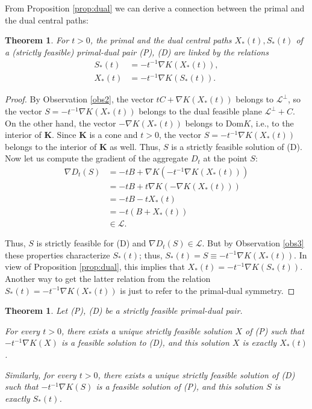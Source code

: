 \documentclass[11pt,a4paper]{article}
\newtheorem{theorem}[thm]{Theorem}
\begin{document}
From Proposition \ref{prop:dual} we can derive a connection between the primal and the dual central paths:

\begin{theorem}
    For $t>0$, the primal and the dual central paths $X_*(t), S_*(t)$ of a (strictly feasible) primal-dual pair (P), (D) are linked by the relations
    \begin{align*}
        S_*(t) &= -t^{-1}\nabla K(X_*(t)),\\
        X_*(t) &= -t^{-1}\nabla K(S_*(t)).
    \end{align*}
\end{theorem}

\begin{proof}
By Observation \ref{obs2}, the vector $tC+\nabla K(X_*(t))$ belongs to $\mathcal{L}^\perp$, so the vector $S = -t^{-1}\nabla K(X_*(t))$ belongs to the dual feasible plane $\mathcal{L}^\perp+C$. On the other hand, the vector $-\nabla K(X_*(t))$ belongs to Dom$K$, i.e., to the interior of $\textbf{K}$. Since $\textbf{K}$ is a cone and $t>0$, the vector $S=-t^{-1}\nabla K(X_*(t))$ belongs to the interior of $\textbf{K}$ as well. Thus, $S$ is a strictly feasible solution of (D). Now let us compute the gradient of the aggregate $D_t$ at the point $S$:
\begin{align*}
    \nabla D_t(S) 
    &= -tB+\nabla K(-t^{-1}\nabla K(X_*(t)))\\
    &= -tB+t\nabla K(-\nabla K(X_*(t)))\\
    &= -tB - tX_*(t)\\
    &= -t(B+X_*(t))\\
    &\in \mathcal{L}.
\end{align*}

Thus, $S$ is strictly feasible for (D) and $\nabla D_t(S) \in \mathcal{L}$. But by Observation \ref{obs3} these properties characterize $S_*(t)$; thus, $S_*(t)=S\equiv -t^{-1}\nabla K(X_*(t))$. In view of Proposition \ref{prop:dual}, this implies that $X_*(t) = -t^{-1}\nabla K(S_*(t))$. Another way to get the latter relation from the relation $S_*(t) = -t^{-1}\nabla K(X_*(t))$ is just to refer to the primal-dual symmetry.
\end{proof}

\begin{theorem}\label{teo:charac}
    Let (P), (D) be a strictly feasible primal-dual pair.
    
    For every $t>0$, there exists a unique strictly feasible solution $X$ of (P) such that $-t^{-1}\nabla K(X)$ is a feasible solution to (D), and this solution $X$ is exactly $X_*(t)$.
    
    Similarly, for every $t>0$, there exists a unique strictly feasible solution of (D) such that $-t^{-1}\nabla K(S)$ is a feasible solution of (P), and this solution $S$ is exactly $S_*(t)$.
\end{theorem}
\end{document}

